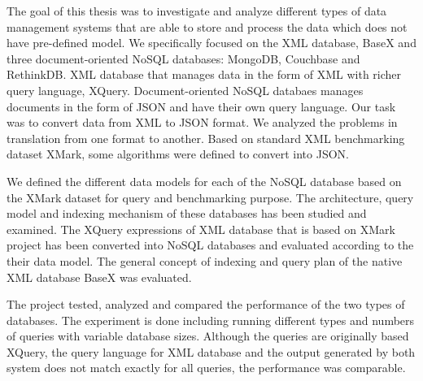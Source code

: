 The goal of this thesis was to investigate and analyze  different types of data management systems that are able to store and process the data which does not have pre-defined model.
We specifically focused on the XML database, BaseX and three document-oriented NoSQL databases: MongoDB, Couchbase and RethinkDB. XML database that manages data in the form of XML with richer query language, XQuery. Document-oriented NoSQL databaes manages documents in the form of JSON and have their own query language.
Our task was to convert data from XML to JSON format. We analyzed the problems  in translation from one format to another.  Based on  standard XML benchmarking dataset XMark, some algorithms were defined to convert into JSON.
\par
We defined the different data models for each of the NoSQL database based on the XMark dataset for query and benchmarking purpose. The architecture, query model and indexing mechanism of these databases has been studied and examined. 
The XQuery expressions of XML database that is based on XMark project has been converted into NoSQL databases and evaluated according to the their data model. The general concept of indexing and query plan of the native XML database BaseX was evaluated. 
\par
The project tested, analyzed and compared the performance of the two types of databases. The experiment is done including running different types and numbers of queries with variable database sizes. Although the queries are originally based XQuery, the query language for XML database and the output generated by both system does not match exactly for all queries, the performance was comparable. 









